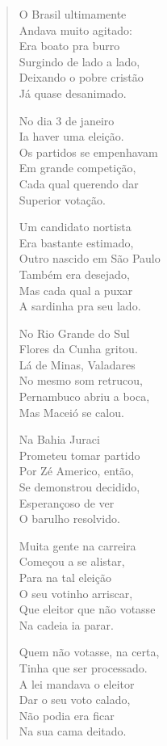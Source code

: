 \begin{verse}
O Brasil ultimamente\\
Andava muito agitado:\\
Era boato pra burro\\
Surgindo de lado a lado,\\
Deixando o pobre cristão\\
Já quase desanimado.

No dia 3 de janeiro\\
Ia haver uma eleição.\\
Os partidos se empenhavam\\
Em grande competição,\\
Cada qual querendo dar\\
Superior votação.

Um candidato nortista\\
Era bastante estimado,\\
Outro nascido em São Paulo\\
Também era desejado,\\
Mas cada qual a puxar\\
A sardinha pra seu lado.


No Rio Grande do Sul\\
Flores da Cunha gritou.\\
Lá de Minas, Valadares\\
No mesmo som retrucou,\\
Pernambuco abriu a boca,\\
Mas Maceió se calou. 

Na Bahia Juraci\\
Prometeu tomar partido\\
Por Zé Americo, então,\\
Se demonstrou decidido,\\
Esperançoso de ver\\
O barulho resolvido.

Muita gente na carreira\\
Começou a se alistar,\\
Para na tal eleição\\
O seu votinho arriscar,\\
Que eleitor que não votasse\\
Na cadeia ia parar.

Quem não votasse, na certa, \\
Tinha que ser processado.\\
A lei mandava o eleitor\\
Dar o seu voto calado,\\
Não podia era ficar\\
Na sua cama deitado.



\end{verse}
